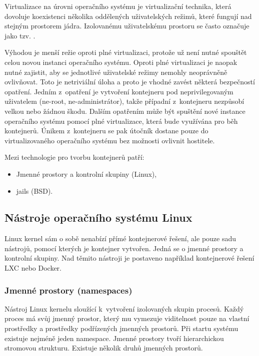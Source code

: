
Virtualizace na úrovni operačního systému je virtualizační technika, která dovoluje koexistenci několika oddělených uživatelských režimů, které fungují nad stejným prostorem jádra.
Izolovanému uživatelskému prostoru se často označuje jako tzv. .

Výhodou je menší režie oproti plné virtualizaci, protože už není nutné spouštět celou novou instanci operačního systému.
Oproti plné virtualizaci je naopak nutné zajistit, aby se jednotlivé uživatelské režimy nemohly neoprávněně ovlivňovat.
Toto je netriviální úloha a proto je vhodné zavést některá bezpečností opatření.
Jedním z~opatření je vytvoření kontejneru pod neprivilegovaným uživatelem (ne-root, ne-administrátor), takže případní  z~kontejneru nezpůsobí velkou nebo žádnou škodu.
Dalším opatřením může být spuštění nové instance operačního systému pomocí plné virtualizace, která bude využívána pro běh kontejnerů.
Únikem z~kontejneru se pak útočník dostane pouze do virtualizovaného operačního systému bez možnosti ovlivnit hostitele.

{
Mezi technologie pro tvorbu kontejnerů patří:

\begin{itemize}
	\item Jmenné prostory a kontrolní skupiny (Linux),
	\item jails (BSD).
\end{itemize}
}

\subsection{Nástroje operačního systému Linux}

Linux kernel sám o sobě nenabízí přímé kontejnerové řešení, ale pouze sadu nástrojů, pomocí kterých je kontejner vytvořen.
Jedná se o jmenné prostory a kontrolní skupiny.
Nad těmito nástroji je postaveno například kontejnerové řešení LXC nebo Docker.

\subsubsection{Jmenné prostory (namespaces)}

Nástroj Linux kernelu sloužící k~vytvoření izolovaných skupin procesů.
Každý proces má svůj jmenný prostor, který mu vymezuje viditelnost pouze na vlastní prostředky a prostředky podřízených jmenných prostorů.
Při startu systému existuje nejméně jeden namespace.
Jmenné prostory tvoří hierarchickou stromovou strukturu.
Existuje několik druhů jmenných prostorů.

